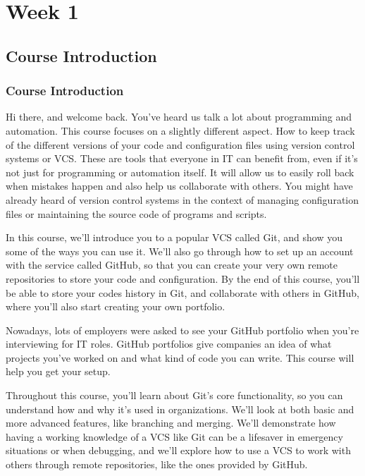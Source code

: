 %
%
%
\chapter{Week 1}

\section{Course Introduction}

	\subsection{Course Introduction}

Hi there, and welcome back. You've heard us talk a lot about programming and automation. This course focuses on a slightly different aspect. How to keep track of the different versions of your code and configuration files using version control systems or VCS. These are tools that everyone in IT can benefit from, even if it's not just for programming or automation itself. 
It will allow us to easily roll back when mistakes happen and also help us collaborate with others. You might have already heard of version control systems in the context of managing configuration files or maintaining the source code of programs and scripts.

In this course, we'll introduce you to a popular VCS called Git, and show you some of the ways you can use it. We'll also go through how to set up an account with the service called GitHub, so that you can create your very own remote repositories to store your code and configuration. 
By the end of this course, you'll be able to store your codes history in Git, and collaborate with others in GitHub, where you'll also start creating your own portfolio. 

Nowadays, lots of employers were asked to see your GitHub portfolio when you're interviewing for IT roles. GitHub portfolios give companies an idea of what projects you've worked on and what kind of code you can write. This course will help you get your setup. 

Throughout this course, you'll learn about Git's core functionality, so you can understand how and why it's used in organizations. We'll look at both basic and more advanced features, like branching and merging. We'll demonstrate how having a working knowledge of a VCS like Git can be a lifesaver in emergency situations or when debugging, and we'll explore how to use a VCS to work with others through remote repositories, like the ones provided by GitHub. 

